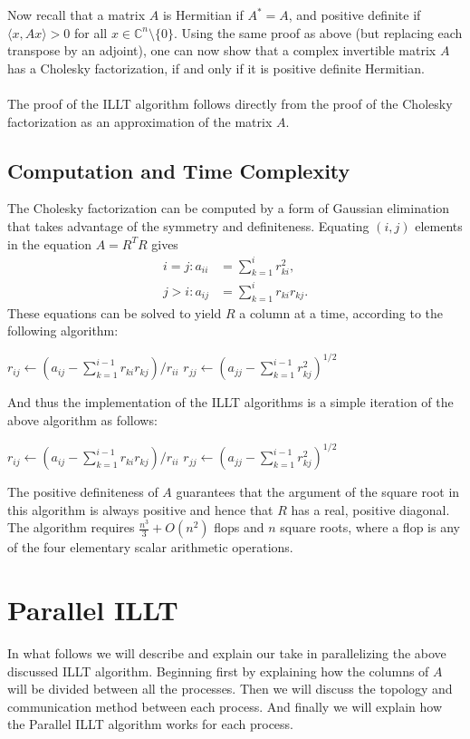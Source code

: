 \documentclass[11pt]{article}
\theoremstyle{definition}
\begin{document}
Now recall that a matrix $A$ is Hermitian if $A^*=A$, and positive definite if $\langle x,Ax\rangle>0$ for all $x\in\mathbb{C}^n\setminus\{0\}$. Using the same proof as above (but replacing each transpose by an adjoint), one can now show that a complex invertible matrix $A$ has a Cholesky factorization, if and only if it is positive definite Hermitian. \\\\
The proof of the ILLT algorithm follows directly from the proof of the Cholesky factorization as an approximation of the matrix $A$.

\subsection{Computation and Time Complexity}

The Cholesky factorization can be computed by a form of Gaussian elimination that takes advantage of the symmetry and definiteness. Equating $(i,j)$ elements in the equation $A=R^TR$ gives
\begin{align*}
i=j:a_{ii}&=\sum_{k=1}^ir^2_{ki}, \\
j>i:a_{ij}&=\sum_{k=1}^ir_{ki}r_{kj}.
\end{align*}
These equations can be solved to yield $R$ a column at a time, according to the following algorithm:
\begin{algorithmic}
    	\State $r_{ij}\gets (a_{ij}-\sum_{k=1}^{i-1}r_{ki}r_{kj})/r_{ii}$
	\EndFor
	\State $r_{jj}\gets (a_{jj}-\sum_{k=1}^{i-1}r_{kj}^2)^{1/2}$
\EndFor
\end{algorithmic}
And thus the implementation of the ILLT algorithms is a simple iteration of the above algorithm as follows:
\begin{algorithmic}
    		\State $r_{ij}\gets (a_{ij}-\sum_{k=1}^{i-1}r_{ki}r_{kj})/r_{ii}$
    	\EndIf
	\EndFor
	\State $r_{jj}\gets (a_{jj}-\sum_{k=1}^{i-1}r_{kj}^2)^{1/2}$
\EndFor
\end{algorithmic}
The positive definiteness of $A$ guarantees that the argument of the square root in this algorithm is always positive and hence that $R$ has a real, positive diagonal. The algorithm requires $\frac{n^3}{3}+O(n^2)$ flops and $n$ square roots, where a flop is any of the four elementary scalar arithmetic operations.

\section{Parallel ILLT}
In what follows we will describe and explain our take in parallelizing the above discussed ILLT algorithm. Beginning first by explaining how the columns of $A$ will be divided between all the processes. Then we will discuss the topology and communication method between each process. And finally we will explain how the Parallel ILLT algorithm works for each process.
\end{document}

